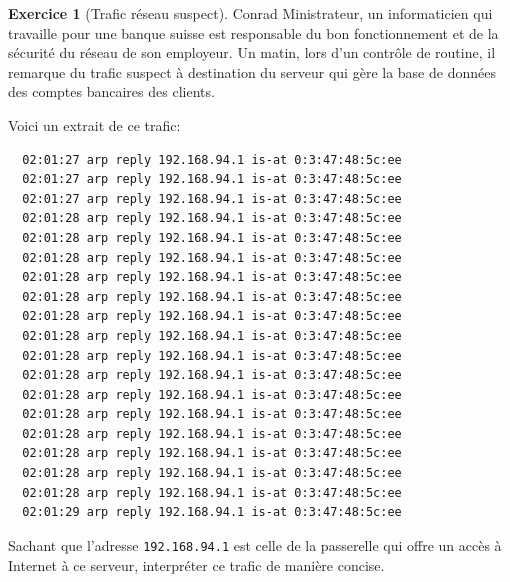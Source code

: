 \documentclass[a4paper,9pt]{article}
\theoremstyle{plain}
\theoremstyle{definition}
\newtheorem{exercice}{Exercice}
\begin{document}
\begin{exercice}[Trafic réseau suspect]
  Conrad Ministrateur, un informaticien qui travaille pour une banque suisse est responsable du bon fonctionnement et de la sécurité du réseau de son employeur. Un matin, lors d'un contrôle de routine, il remarque du trafic suspect à destination du serveur qui gère la base de données des comptes bancaires des clients.
  \bigskip
  
Voici un extrait de ce trafic:

\begin{verbatim}
  02:01:27 arp reply 192.168.94.1 is-at 0:3:47:48:5c:ee
  02:01:27 arp reply 192.168.94.1 is-at 0:3:47:48:5c:ee
  02:01:27 arp reply 192.168.94.1 is-at 0:3:47:48:5c:ee
  02:01:28 arp reply 192.168.94.1 is-at 0:3:47:48:5c:ee
  02:01:28 arp reply 192.168.94.1 is-at 0:3:47:48:5c:ee
  02:01:28 arp reply 192.168.94.1 is-at 0:3:47:48:5c:ee
  02:01:28 arp reply 192.168.94.1 is-at 0:3:47:48:5c:ee
  02:01:28 arp reply 192.168.94.1 is-at 0:3:47:48:5c:ee
  02:01:28 arp reply 192.168.94.1 is-at 0:3:47:48:5c:ee
  02:01:28 arp reply 192.168.94.1 is-at 0:3:47:48:5c:ee
  02:01:28 arp reply 192.168.94.1 is-at 0:3:47:48:5c:ee
  02:01:28 arp reply 192.168.94.1 is-at 0:3:47:48:5c:ee
  02:01:28 arp reply 192.168.94.1 is-at 0:3:47:48:5c:ee
  02:01:28 arp reply 192.168.94.1 is-at 0:3:47:48:5c:ee
  02:01:28 arp reply 192.168.94.1 is-at 0:3:47:48:5c:ee
  02:01:28 arp reply 192.168.94.1 is-at 0:3:47:48:5c:ee
  02:01:28 arp reply 192.168.94.1 is-at 0:3:47:48:5c:ee
  02:01:28 arp reply 192.168.94.1 is-at 0:3:47:48:5c:ee
  02:01:29 arp reply 192.168.94.1 is-at 0:3:47:48:5c:ee
\end{verbatim}

Sachant que l'adresse \verb|192.168.94.1| est celle de la passerelle qui offre un accès à Internet à ce serveur, interpréter ce trafic de manière concise. 
\end{exercice}



\end{document}
